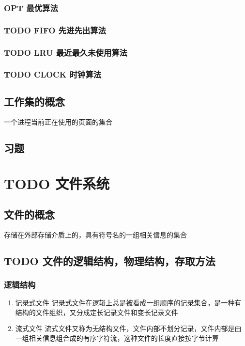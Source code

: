 \documentclass[11pt]{article}
\begin{document}
\subsubsection{OPT 最优算法}
\label{sec-3-6-1}
\subsubsection{{\bfseries\sffamily TODO} FIFO 先进先出算法}
\label{sec-3-6-2}
\subsubsection{{\bfseries\sffamily TODO} LRU 最近最久未使用算法}
\label{sec-3-6-3}
\subsubsection{{\bfseries\sffamily TODO} CLOCK 时钟算法}
\label{sec-3-6-4}
\subsection{工作集的概念}
\label{sec-3-7}
一个进程当前正在使用的页面的集合
\subsection{习题}
\label{sec-3-8}

\section{{\bfseries\sffamily TODO} 文件系统}
\label{sec-4}
\subsection{文件的概念}
\label{sec-4-1}
存储在外部存储介质上的，具有符号名的一组相关信息的集合
\subsection{{\bfseries\sffamily TODO} 文件的逻辑结构，物理结构，存取方法}
\label{sec-4-2}
\subsubsection{逻辑结构}
\label{sec-4-2-1}
\begin{enumerate}
\item 记录式文件
\label{sec-4-2-1-1}
记录式文件在逻辑上总是被看成一组顺序的记录集合，是一种有结构的文件组织，又分成定长记录文件和变长记录文件
\item 流式文件
\label{sec-4-2-1-2}
流式文件又称为无结构文件，文件内部不划分记录，文件内部是由一组相关信息组合成的有序字符流，这种文件的长度直接按字节计算
\end{enumerate}
\end{document}
